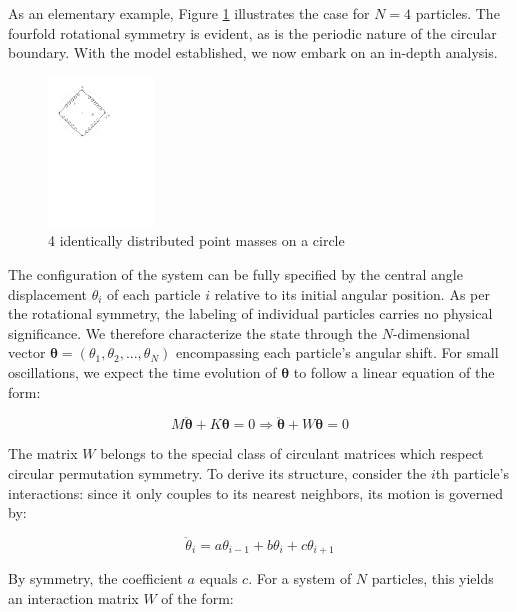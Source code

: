 \documentclass[final,5p,times,twocolumn,authoryear]{elsarticle}
\begin{document}
As an elementary example, Figure \ref{fig-n4} illustrates the case for $N=4$ particles. The fourfold rotational symmetry is evident, as is the periodic nature of the circular boundary. With the model established, we now embark on an in-depth analysis.

\begin{figure}[h]
	\centering 
	\includegraphics[width=0.25\textwidth]{../Figures/1D-4Particle-Springs.pdf}	
	\caption{4 identically distributed point masses on a circle} 
	\label{fig-n4}
\end{figure}

The configuration of the system can be fully specified by the central angle displacement $\theta_i$ of each particle $i$ relative to its initial angular position. As per the rotational symmetry, the labeling of individual particles carries no physical significance. We therefore characterize the state through the $N$-dimensional vector $\bm{\theta} = (\theta_1, \theta_2, ..., \theta_N)$ encompassing each particle's angular shift. For small oscillations, we expect the time evolution of $\bm{\theta}$ to follow a linear equation of the form:

\begin{equation}
	M\ddot{\bm{\theta}} + K\bm{\theta} = 0 \Rightarrow \ddot{\bm{\theta}} + W\bm{\theta} = 0
	\label{eq-funda}
\end{equation}

The matrix $W$ belongs to the special class of circulant matrices which respect circular permutation symmetry. To derive its structure, consider the $i$th particle's interactions: since it only couples to its nearest neighbors, its motion is governed by:

\begin{equation*}
	\ddot{\theta}_i = a \theta_{i-1} + b \theta_i + c \theta_{i+1}
\end{equation*}

By symmetry, the coefficient $a$ equals $c$. For a system of $N$ particles, this yields an interaction matrix $W$ of the form:
\end{document}
